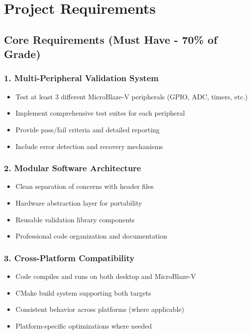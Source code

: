 \documentclass[11pt,a4paper]{article}
\begin{document}
\section{Project Requirements}

\subsection{Core Requirements (Must Have - 70\% of Grade)}

\subsubsection{1. Multi-Peripheral Validation System}
\begin{itemize}
    \item Test at least 3 different MicroBlaze-V peripherals (GPIO, ADC, timers, etc.)
    \item Implement comprehensive test suites for each peripheral
    \item Provide pass/fail criteria and detailed reporting
    \item Include error detection and recovery mechanisms
\end{itemize}

\subsubsection{2. Modular Software Architecture}
\begin{itemize}
    \item Clean separation of concerns with header files
    \item Hardware abstraction layer for portability
    \item Reusable validation library components
    \item Professional code organization and documentation
\end{itemize}

\subsubsection{3. Cross-Platform Compatibility}
\begin{itemize}
    \item Code compiles and runs on both desktop and MicroBlaze-V
    \item CMake build system supporting both targets
    \item Consistent behavior across platforms (where applicable)
    \item Platform-specific optimizations where needed
\end{itemize}
\end{document}
